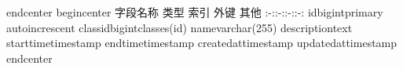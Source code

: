 {}\markdownRendererBackslash{}end\markdownRendererLeftBrace{}center\markdownRendererRightBrace{}\markdownRendererInterblockSeparator
{}\markdownRendererInterblockSeparator
{}\markdownRendererBackslash{}begin\markdownRendererLeftBrace{}center\markdownRendererRightBrace{}\markdownRendererInterblockSeparator
{}\markdownRendererPipe{} 字段名称 \markdownRendererPipe{} 类型 \markdownRendererPipe{} 索引 \markdownRendererPipe{} 外键 \markdownRendererPipe{} 其他 \markdownRendererPipe{} \markdownRendererPipe{}:-:\markdownRendererPipe{}:-:\markdownRendererPipe{}:-:\markdownRendererPipe{}:-:\markdownRendererPipe{} \markdownRendererPipe{}id\markdownRendererPipe{}bigint\markdownRendererPipe{}primary\markdownRendererPipe{}\markdownRendererPipe{} auto\markdownRendererBackslash{}\markdownRendererUnderscore{}increscent\markdownRendererPipe{} \markdownRendererPipe{}class\markdownRendererBackslash{}\markdownRendererUnderscore{}id\markdownRendererPipe{}bigint\markdownRendererPipe{}\markdownRendererPipe{}classes(id)\markdownRendererPipe{}\markdownRendererPipe{} \markdownRendererPipe{}name\markdownRendererPipe{}varchar(255)\markdownRendererPipe{}\markdownRendererPipe{}\markdownRendererPipe{}\markdownRendererPipe{} \markdownRendererPipe{}description\markdownRendererPipe{}text\markdownRendererPipe{}\markdownRendererPipe{}\markdownRendererPipe{}\markdownRendererPipe{} \markdownRendererPipe{}start\markdownRendererBackslash{}\markdownRendererUnderscore{}time\markdownRendererPipe{}timestamp\markdownRendererPipe{}\markdownRendererPipe{}\markdownRendererPipe{}\markdownRendererPipe{} \markdownRendererPipe{}end\markdownRendererBackslash{}\markdownRendererUnderscore{}time\markdownRendererPipe{}timestamp\markdownRendererPipe{}\markdownRendererPipe{}\markdownRendererPipe{}\markdownRendererPipe{} \markdownRendererPipe{}created\markdownRendererBackslash{}\markdownRendererUnderscore{}at\markdownRendererPipe{}timestamp\markdownRendererPipe{}\markdownRendererPipe{}\markdownRendererPipe{}\markdownRendererPipe{} \markdownRendererPipe{}updated\markdownRendererBackslash{}\markdownRendererUnderscore{}at\markdownRendererPipe{}timestamp\markdownRendererPipe{}\markdownRendererPipe{}\markdownRendererPipe{}\markdownRendererPipe{}\markdownRendererInterblockSeparator
{}\markdownRendererBackslash{}end\markdownRendererLeftBrace{}center\markdownRendererRightBrace{}\markdownRendererInterblockSeparator
{}\markdownRendererInterblockSeparator

